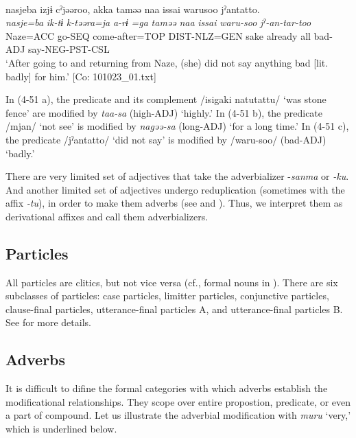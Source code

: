 \ex{}\\ 
     \glll  nasjeba  izjɨ  cˀjəəroo,  akka  taməə   naa  issai  warusoo  jˀantatto.\\
      \textit{nasje=ba}  \textit{ik-tɨ}  \textit{k-təəra=ja}  \textit{a-rɨ} \textit{=ga}  \textit{taməə}  \textit{naa}  \textit{issai}  \textit{waru-soo}  \textit{jˀ-an-tar-too}\\
      Naze=ACC  go-SEQ  come-after=TOP  DIST-NLZ=GEN  sake                                                already  all  bad-ADJ  say-NEG-PST-CSL\\
      \glt ‘After going to and returning from Naze, (she) did not say anything bad [lit. badly] for him.’    [Co: 101023\_01.txt]
    \z
\z

In (4-51 a), the predicate and its complement /isigaki natutattu/ ‘was stone fence’ are modified by \textit{taa-sa} (high-ADJ) ‘highly.’ In (4-51 b), the predicate /mjan/ ‘not see’ is modified by \textit{nagəə-sa} (long-ADJ) ‘for a long time.’ In (4-51 c), the predicate /jˀantatto/ ‘did not say’ is modified by /waru-soo/ (bad-ADJ) ‘badly.’

There are very limited set of adjectives that take the adverbializer -\textit{sanma} or \textit{{}-ku}. And another limited set of adjectives undergo reduplication (sometimes with the affix \textit{{}-tu}), in order to make them adverbs (see  and ). Thus, we interpret them as derivational affixes and call them adverbializers.

\subsection{Particles}\label{sec:4.3.5}

All particles are clitics, but not vice versa (cf., formal nouns in ). There are six subclasses of particles: case particles, limitter particles, conjunctive particles, clause-final particles, utterance-final particles A, and utterance-final particles B. See  for more details.

\subsection{Adverbs}\label{sec:4.3.6}

It is difficult to difine the formal categories with which adverbs establish the modificational relationships. They scope over entire propostion, predicate, or even a part of compound. Let us illustrate the adverbial modification with \textit{muru} ‘very,’ which is underlined below.

